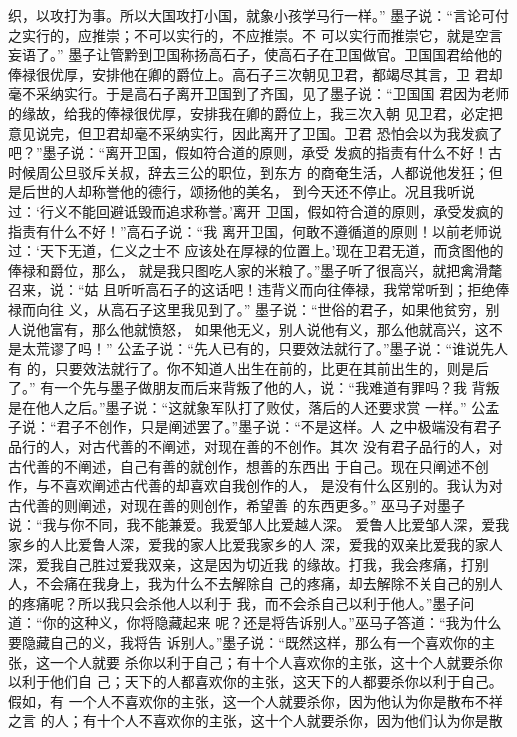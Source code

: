 \documentclass[12pt,UTF8]{ctexbook}
\begin{document}
织，以攻打为事。所以大国攻打小国，就象小孩学马行一样。” 
墨子说：“言论可付之实行的，应推崇；不可以实行的，不应推崇。不 
可以实行而推崇它，就是空言妄语了。” 
墨子让管黔到卫国称扬高石子，使高石子在卫国做官。卫国国君给他的 
俸禄很优厚，安排他在卿的爵位上。高石子三次朝见卫君，都竭尽其言，卫 
君却毫不采纳实行。于是高石子离开卫国到了齐国，见了墨子说：“卫国国 
君因为老师的缘故，给我的俸禄很优厚，安排我在卿的爵位上，我三次入朝 
见卫君，必定把意见说完，但卫君却毫不采纳实行，因此离开了卫国。卫君 
恐怕会以为我发疯了吧？”墨子说：“离开卫国，假如符合道的原则，承受 
发疯的指责有什么不好！古时候周公旦驳斥关叔，辞去三公的职位，到东方 
的商奄生活，人都说他发狂；但是后世的人却称誉他的德行，颂扬他的美名， 
到今天还不停止。况且我听说过：‘行义不能回避诋毁而追求称誉。’离开 
卫国，假如符合道的原则，承受发疯的指责有什么不好！”高石子说：“我 
离开卫国，何敢不遵循道的原则！以前老师说过：‘天下无道，仁义之士不 
应该处在厚禄的位置上。’现在卫君无道，而贪图他的俸禄和爵位，那么， 
就是我只图吃人家的米粮了。”墨子听了很高兴，就把禽滑氂召来，说：“姑 
且听听高石子的这话吧！违背义而向往俸禄，我常常听到；拒绝俸禄而向往 
义，从高石子这里我见到了。” 
墨子说：“世俗的君子，如果他贫穷，别人说他富有，那么他就愤怒， 
如果他无义，别人说他有义，那么他就高兴，这不是太荒谬了吗！” 
公孟子说：“先人已有的，只要效法就行了。”墨子说：“谁说先人有 
的，只要效法就行了。你不知道人出生在前的，比更在其前出生的，则是后 
了。” 
有一个先与墨子做朋友而后来背叛了他的人，说：“我难道有罪吗？我 
背叛是在他人之后。”墨子说：“这就象军队打了败仗，落后的人还要求赏 
一样。” 
公孟子说：“君子不创作，只是阐述罢了。”墨子说：“不是这样。人 
之中极端没有君子品行的人，对古代善的不阐述，对现在善的不创作。其次 
没有君子品行的人，对古代善的不阐述，自己有善的就创作，想善的东西出 
于自己。现在只阐述不创作，与不喜欢阐述古代善的却喜欢自我创作的人， 
是没有什么区别的。我认为对古代善的则阐述，对现在善的则创作，希望善 
的东西更多。” 
巫马子对墨子说：“我与你不同，我不能兼爱。我爱邹人比爱越人深。 
爱鲁人比爱邹人深，爱我家乡的人比爱鲁人深，爱我的家人比爱我家乡的人 
深，爱我的双亲比爱我的家人深，爱我自己胜过爱我双亲，这是因为切近我 
的缘故。打我，我会疼痛，打别人，不会痛在我身上，我为什么不去解除自 
己的疼痛，却去解除不关自己的别人的疼痛呢？所以我只会杀他人以利于 
我，而不会杀自己以利于他人。”墨子问道：“你的这种义，你将隐藏起来 
呢？还是将告诉别人。”巫马子答道：“我为什么要隐藏自己的义，我将告 
诉别人。”墨子说：“既然这样，那么有一个喜欢你的主张，这一个人就要 
杀你以利于自己；有十个人喜欢你的主张，这十个人就要杀你以利于他们自 
己；天下的人都喜欢你的主张，这天下的人都要杀你以利于自己。假如，有 
一个人不喜欢你的主张，这一个人就要杀你，因为他认为你是散布不祥之言 
的人；有十个人不喜欢你的主张，这十个人就要杀你，因为他们认为你是散 
\end{document}
